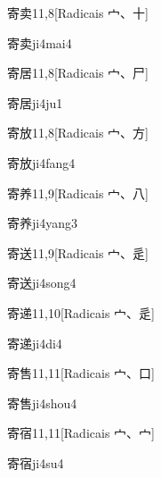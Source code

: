 \begin{entry}{寄卖}{11,8}[Radicais ⼧、⼗]
  \begin{phonetics}{寄卖}{ji4mai4}
  \end{phonetics}
\end{entry}

\begin{entry}{寄居}{11,8}[Radicais ⼧、⼫]
  \begin{phonetics}{寄居}{ji4ju1}
  \end{phonetics}
\end{entry}

\begin{entry}{寄放}{11,8}[Radicais ⼧、⽅]
  \begin{phonetics}{寄放}{ji4fang4}
  \end{phonetics}
\end{entry}

\begin{entry}{寄养}{11,9}[Radicais ⼧、⼋]
  \begin{phonetics}{寄养}{ji4yang3}
  \end{phonetics}
\end{entry}

\begin{entry}{寄送}{11,9}[Radicais ⼧、⾡]
  \begin{phonetics}{寄送}{ji4song4}
  \end{phonetics}
\end{entry}

\begin{entry}{寄递}{11,10}[Radicais ⼧、⾡]
  \begin{phonetics}{寄递}{ji4di4}
  \end{phonetics}
\end{entry}

\begin{entry}{寄售}{11,11}[Radicais ⼧、⼝]
  \begin{phonetics}{寄售}{ji4shou4}
  \end{phonetics}
\end{entry}

\begin{entry}{寄宿}{11,11}[Radicais ⼧、⼧]
  \begin{phonetics}{寄宿}{ji4su4}
  \end{phonetics}
\end{entry}

